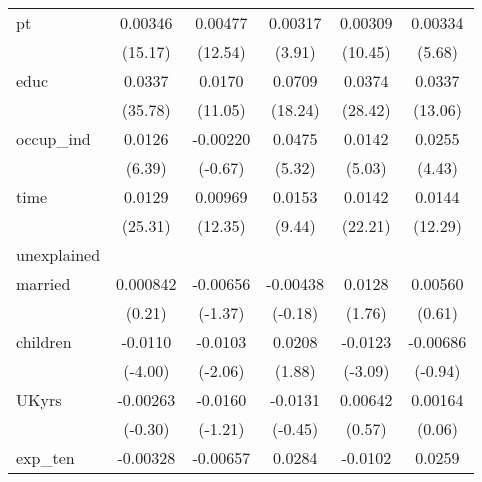 {\begin{longtable}{l*{5}{c}}
pt          &     0.00346\sym{***}&     0.00477\sym{***}&     0.00317\sym{***}&     0.00309\sym{***}&     0.00334\sym{***}\\
            &     (15.17)         &     (12.54)         &      (3.91)         &     (10.45)         &      (5.68)         \\
educ        &      0.0337\sym{***}&      0.0170\sym{***}&      0.0709\sym{***}&      0.0374\sym{***}&      0.0337\sym{***}\\
            &     (35.78)         &     (11.05)         &     (18.24)         &     (28.42)         &     (13.06)         \\
occup\_ind   &      0.0126\sym{***}&    -0.00220         &      0.0475\sym{***}&      0.0142\sym{***}&      0.0255\sym{***}\\
            &      (6.39)         &     (-0.67)         &      (5.32)         &      (5.03)         &      (4.43)         \\
time        &      0.0129\sym{***}&     0.00969\sym{***}&      0.0153\sym{***}&      0.0142\sym{***}&      0.0144\sym{***}\\
            &     (25.31)         &     (12.35)         &      (9.44)         &     (22.21)         &     (12.29)         \\
\hline
unexplained &                     &                     &                     &                     &                     \\
married     &    0.000842         &    -0.00656         &    -0.00438         &      0.0128         &     0.00560         \\
            &      (0.21)         &     (-1.37)         &     (-0.18)         &      (1.76)         &      (0.61)         \\
children    &     -0.0110\sym{***}&     -0.0103\sym{*}  &      0.0208         &     -0.0123\sym{**} &    -0.00686         \\
            &     (-4.00)         &     (-2.06)         &      (1.88)         &     (-3.09)         &     (-0.94)         \\
UKyrs       &    -0.00263         &     -0.0160         &     -0.0131         &     0.00642         &     0.00164         \\
            &     (-0.30)         &     (-1.21)         &     (-0.45)         &      (0.57)         &      (0.06)         \\
exp\_ten     &    -0.00328         &    -0.00657         &      0.0284         &     -0.0102         &      0.0259         \\

\end{longtable}}
